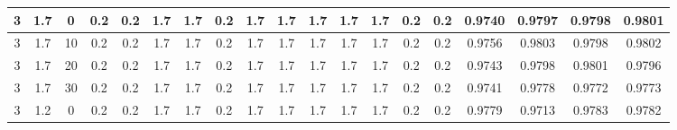\documentclass{ieeeaccess}
\begin{document}
\begin{table*}
{\begin{tabular}{|c|c|c|c|c|c|c|c|c|c|c|c|c|c|c|c|c|c|c|}
\hline
3 & 1.7                   & 0      & 0.2                     & 0.2                     & 1.7                     & 1.7                     & 0.2                     & 1.7                     & 1.7                     & 1.7                     & 1.7                     & 1.7                     & 0.2                     & 0.2 & 0.9740                                     & 0.9797                                     & 0.9798                                     & 0.9801                                      \\ 
\hline
3 & 1.7                   & 10     & 0.2                     & 0.2                     & 1.7                     & 1.7                     & 0.2                     & 1.7                     & 1.7                     & 1.7                     & 1.7                     & 1.7                     & 0.2                     & 0.2 & 0.9756                                     & 0.9803                                     & 0.9798                                     & 0.9802                                      \\ 
\hline
3 & 1.7                   & 20     & 0.2                     & 0.2                     & 1.7                     & 1.7                     & 0.2                     & 1.7                     & 1.7                     & 1.7                     & 1.7                     & 1.7                     & 0.2                     & 0.2 & 0.9743                                     & 0.9798                                     & 0.9801                                     & 0.9796                                      \\ 
\hline
3 & 1.7                   & 30     & 0.2                     & 0.2                     & 1.7                     & 1.7                     & 0.2                     & 1.7                     & 1.7                     & 1.7                     & 1.7                     & 1.7                     & 0.2                     & 0.2 & 0.9741                                     & 0.9778                                     & 0.9772                                     & 0.9773                                      \\ 
\hline
3 & 1.2                   & 0      & 0.2                     & 0.2                     & 1.7                     & 1.7                     & 0.2                     & 1.7                     & 1.7                     & 1.7                     & 1.7                     & 1.7                     & 0.2                     & 0.2 & \textcolor[rgb]{0.122,0.122,0.129}{0.9779} & \textcolor[rgb]{0.122,0.122,0.129}{0.9713} & \textcolor[rgb]{0.122,0.122,0.129}{0.9783} & \textcolor[rgb]{0.122,0.122,0.129}{0.9782}  \\ 

\end{tabular}}
\end{table*}
\end{document}
